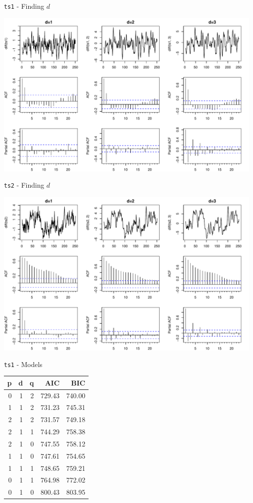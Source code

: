 \documentclass[11pt,ignorenonframetext,]{beamer}
\begin{document}
\begin{frame}{\texttt{ts1} - Finding \(d\)}

\includegraphics{Lec9_files/figure-beamer/unnamed-chunk-6-1.pdf}

\end{frame}

\begin{frame}{\texttt{ts2} - Finding \(d\)}

\includegraphics{Lec9_files/figure-beamer/unnamed-chunk-7-1.pdf}

\end{frame}

\begin{frame}{\texttt{ts1} - Models}

\begin{longtable}[]{@{}rrrrr@{}}
\toprule
p & d & q & AIC & BIC\tabularnewline
\midrule
\endhead
0 & 1 & 2 & 729.43 & 740.00\tabularnewline
1 & 1 & 2 & 731.23 & 745.31\tabularnewline
2 & 1 & 2 & 731.57 & 749.18\tabularnewline
2 & 1 & 1 & 744.29 & 758.38\tabularnewline
2 & 1 & 0 & 747.55 & 758.12\tabularnewline
1 & 1 & 0 & 747.61 & 754.65\tabularnewline
1 & 1 & 1 & 748.65 & 759.21\tabularnewline
0 & 1 & 1 & 764.98 & 772.02\tabularnewline
0 & 1 & 0 & 800.43 & 803.95\tabularnewline
\bottomrule
\end{longtable}

\end{frame}
\end{document}
